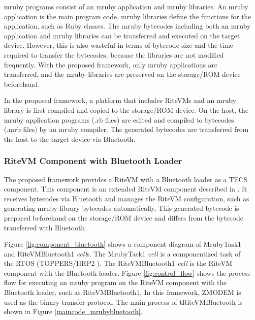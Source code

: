\documentclass[conference]{IEEEtran/IEEEtran/IEEEtran}
\begin{document}
mruby programs consist of an mruby application and mruby libraries.
An mruby application is the main program code, mruby libraries define the functions for the application, such as Ruby classes. 
The mruby bytecodes including both an mruby application and mruby libraries can be transferred and executed on the target device.
However, this is also wasteful in terms of bytecode size and the time required to transfer the bytecodes, because the libraries are not modified frequently.
With the proposed framework, only mruby applications are transferred, and the mruby libraries are preserved on the storage/ROM device beforehand.

In the proposed framework, a platform that includes RiteVMs and an mruby library is first compiled and copied to the storage/ROM device.
On the host, the mruby application programs (.rb files) are edited and compiled to bytecodes (.mrb files) by an mruby compiler.
The generated bytecodes are transferred from the host to the target device via Bluetooth.

\subsubsection{RiteVM Component with Bluetooth Loader}
The proposed framework provides a RiteVM with a Bluetooth loader as a TECS component.
This component is an extended RiteVM component described in \cite{par:mrubyonTECS}.
It receives bytecodes via Bluetooth and manages the RiteVM configuration, such as generating mruby library bytecodes automatically.
This generated bytecode is prepared beforehand on the storage/ROM device and differs from the bytecode transferred with Bluetooth.

Figure \ref{fig:component_bluetooth} shows a component diagram of MrubyTask1 and RiteVMBluetooth1 {\it cell}s.
The MrubyTask1 {\it cell} is a componentized task of the RTOS (TOPPERS/HRP2 \cite{par:hr-tecs}).
The RiteVMBluetooth1 {\it cell} is the RiteVM component with the Bluetooth loader.
Figure \ref{fig:control_flow} shows the process flow for executing an mruby program on the RiteVM component with the Bluetooth loader, such as RiteVMBluetooth1.
In this framework, ZMODEM \cite{par:zmodem} is used as the binary transfer protocol.
The main process of tRiteVMBluetooth is shown in Figure \ref{maincode_mrubybluetooth}.
\end{document}
